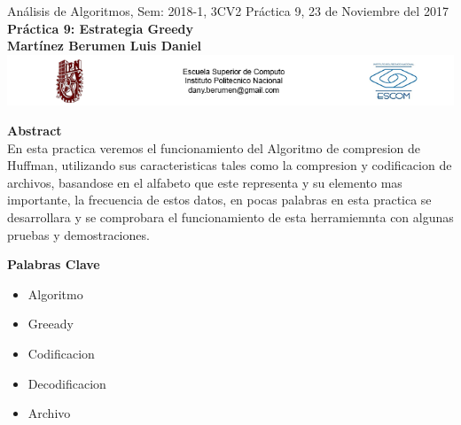 \documentclass[spanish]{article}
\begin{document}
	\setmarginsrb{30mm}{30mm}{30mm}{30mm}{0pt}{0mm}{0pt}{0mm}
	
	\begin{center}
	{ Análisis de Algoritmos, Sem: 2018-1, 3CV2 Práctica 9, 23 de Noviembre del 2017}\\
{ {\bf Práctica 9: Estrategia Greedy}} \\
{ {\bf Martínez Berumen Luis Daniel}} \\
\includegraphics[width=1\textwidth, right]{./imagenes/logos.png}
	\end{center}

	
	\bigskip
	
	\bigskip
	
	\bigskip
	
	{\LARGE {\bf Abstract}}\\
	
	En esta practica veremos el funcionamiento del Algoritmo de compresion de Huffman, utilizando sus caracteristicas tales como la compresion y codificacion de archivos, basandose en el alfabeto que este representa y su elemento mas importante, la frecuencia de estos datos, en pocas palabras en esta practica se desarrollara y se comprobara el funcionamiento de esta herramiemnta con algunas pruebas y demostraciones.

	\bigskip


	{\Large {\bf Palabras Clave}}\\
	\begin{itemize}
		\item Algoritmo
		\item Greeady
		\item Codificacion
		\item Decodificacion
		\item Archivo
	\end{itemize}
	
\end{document}
